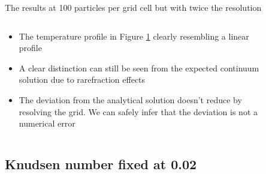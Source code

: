 \documentclass{beamer}
\begin{document}
        \begin{frame}{The results at 100 particles per grid cell but with twice the resolution}
            \begin{columns}
                \begin{column}{0.5\linewidth}
                    \begin{itemize}
                        \setlength\itemsep{0.25cm}
                                
                        \item<1->The temperature profile in Figure \ref{gra:kn0.1_100ppgc_200g} clearly resembling a linear profile

                        \item<2-> A clear distinction can still be seen from the expected continuum solution due to rarefraction effects

                        \item<3-> The deviation from the analytical solution doesn't reduce by resolving the grid. We can safely infer that the deviation is not a numerical error
                    \end{itemize}                    
                \end{column} 
            
                \begin{column}{0.5\linewidth}
                    \begin{figure}
                        \centering
                        
                        \caption{}
                        \label{gra:kn0.1_100ppgc_200g}
                    \end{figure}
                \end{column}
            \end{columns}
        \end{frame}

    \subsection{Knudsen number fixed at 0.02}
\end{document}
